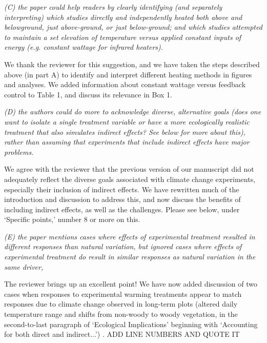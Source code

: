 \documentclass[11pt,a4paper]{letter}
\begin{document}
\begin{letter}{}
\par \emph{(C) the paper could help readers by clearly identifying (and separately interpreting) which studies directly and independently heated both above and belowground, just above-ground, or just below-ground; and which studies attempted to maintain a set elevation of temperature versus applied constant inputs of energy (e.g. constant wattage for infrared heaters).}

\par We thank the reviewer for this suggestion, and we have taken the steps described above (in part A) to identify and interpret different heating methods in figures and analyses. We added information about constant wattage versus feedback control to Table 1, and discuss its relevance in Box 1. 

\par \emph{(D) the authors could do more to acknowledge diverse, alternative goals (does one want to isolate a single treatment variable or have a more ecologically realistic treatment that also simulates indirect effects? See below for more about this), rather than assuming that experiments that include indirect effects have major problems.}

\par We agree with the reviewer that the previous version of our manuscript did not adequately reflect the diverse goals associated with climate change experiments, especially their inclusion of indirect effects. We have rewritten much of the introduction and discussion to address this, and now discuss the benefits of including indirect effects, as well as the challenges. Please see below,  under `Specific points,' number 8 or more on this.


\par \emph{(E) the paper mentions cases where effects of experimental treatment resulted in different responses than natural variation, but ignored cases where effects of experimental treatment do result in similar responses as natural variation in the same driver,}

\par The reviewer brings up an excellent point! We have now added discussion of two cases when responses to experimental warming treatments appear to match responses due to climate change observed in long-term plots (altered daily temperature range and shifts from non-woody to woody vegetation, in the second-to-last paragraph of `Ecological Implications' beginning with `Accounting for both direct and indirect...') . ADD LINE NUMBERS AND QUOTE IT


\end{letter}
\end{document}
